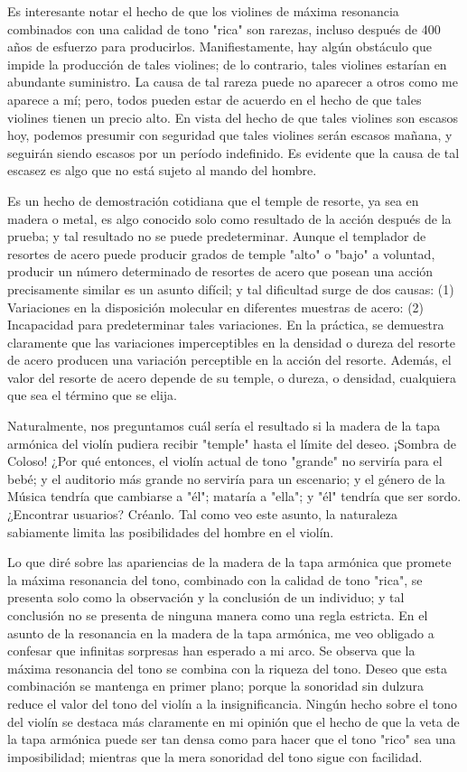 \documentclass[12pt]{book}
\begin{document}
Es interesante notar el hecho de que los violines de máxima resonancia combinados con una calidad de tono "rica" son rarezas, incluso después de 400 años de esfuerzo para producirlos. Manifiestamente, hay algún obstáculo que impide la producción de tales violines; de lo contrario, tales violines estarían en abundante suministro. La causa de tal rareza puede no aparecer a otros como me aparece a mí; pero, todos pueden estar de acuerdo en el hecho de que tales violines tienen un precio alto. En vista del hecho de que tales violines son escasos hoy, podemos presumir con seguridad que tales violines serán escasos mañana, y seguirán siendo escasos por un período indefinido. Es evidente que la causa de tal escasez es algo que no está sujeto al mando del hombre.

Es un hecho de demostración cotidiana que el temple de resorte, ya sea en madera o metal, es algo conocido solo como resultado de la acción después de la prueba; y tal resultado no se puede predeterminar. Aunque el templador de resortes de acero puede producir grados de temple "alto" o "bajo" a voluntad, producir un número determinado de resortes de acero que posean una acción precisamente similar es un asunto difícil; y tal dificultad surge de dos causas: (1) Variaciones en la disposición molecular en diferentes muestras de acero: (2) Incapacidad para predeterminar tales variaciones. En la práctica, se demuestra claramente que las variaciones imperceptibles en la densidad o dureza del resorte de acero producen una variación perceptible en la acción del resorte. Además, el valor del resorte de acero depende de su temple, o dureza, o densidad, cualquiera que sea el término que se elija.

Naturalmente, nos preguntamos cuál sería el resultado si la madera de la tapa armónica del violín pudiera recibir "temple" hasta el límite del deseo. ¡Sombra de Coloso! ¿Por qué entonces, el violín actual de tono "grande" no serviría para el bebé; y el auditorio más grande no serviría para un escenario; y el género de la Música tendría que cambiarse a "él"; mataría a "ella"; y "él" tendría que ser sordo. ¿Encontrar usuarios? Créanlo. Tal como veo este asunto, la naturaleza sabiamente limita las posibilidades del hombre en el violín.

Lo que diré sobre las apariencias de la madera de la tapa armónica que promete la máxima resonancia del tono, combinado con la calidad de tono "rica", se presenta solo como la observación y la conclusión de un individuo; y tal conclusión no se presenta de ninguna manera como una regla estricta. En el asunto de la resonancia en la madera de la tapa armónica, me veo obligado a confesar que infinitas sorpresas han esperado a mi arco. Se observa que la máxima resonancia del tono se combina con la riqueza del tono. Deseo que esta combinación se mantenga en primer plano; porque la sonoridad sin dulzura reduce el valor del tono del violín a la insignificancia. Ningún hecho sobre el tono del violín se destaca más claramente en mi opinión que el hecho de que la veta de la tapa armónica puede ser tan densa como para hacer que el tono "rico" sea una imposibilidad; mientras que la mera sonoridad del tono sigue con facilidad.
\end{document}
